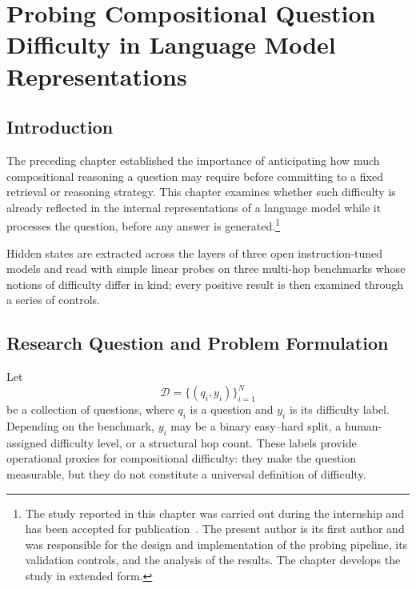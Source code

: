 \chapter[Probing Compositional Question Difficulty in Language Model Representations]
{Probing Compositional Question\\Difficulty in Language Model\\Representations}
\label{chap:probing}

\section*{Introduction}
{}

The preceding chapter established the importance of anticipating how much
compositional reasoning a question may require before committing to a fixed
retrieval or reasoning strategy. This chapter examines whether such difficulty
is already reflected in the internal representations of a language model while
it processes the question, before any answer is
generated.\footnote{The study reported in this chapter was carried out during
  the internship and has been accepted for
  publication~\cite{abdelhedi2026probing}. The present author is its first
  author and was responsible for the design and implementation of the probing
  pipeline, its validation controls, and the analysis of the results. The
  chapter develops the study in extended form.}

Hidden states are extracted across the layers of three open instruction-tuned
models and read with simple linear probes on three multi-hop benchmarks whose
notions of difficulty differ in kind; every positive result is then examined
through a series of controls.

\section{Research Question and Problem Formulation}
\label{sec:probing-problem}

Let
\begin{equation}
  \mathcal{D}=\{(q_i,y_i)\}_{i=1}^{N}
  \label{eq:probing-dataset}
\end{equation}
be a collection of questions, where \(q_i\) is a question and \(y_i\) is its
difficulty label. Depending on the benchmark, \(y_i\) may be a binary
easy--hard split, a human-assigned difficulty level, or a structural hop count.
These labels provide operational proxies for compositional difficulty: they
make the question measurable, but they do not constitute a universal
definition of difficulty.

